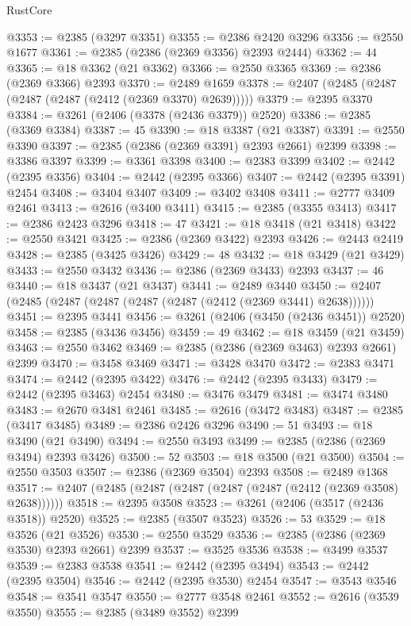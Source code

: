 \begin{lexlean}{RustCore}
\begin{coremodule}
@3353 := @2385 (@3297 @3351)
@3355 := @2386 @2420 @3296
@3356 := @2550 @1677
@3361 := @2385 (@2386 (@2369 @3356) @2393 @2444)
@3362 := 44
@3365 := @18 @3362 (@21 @3362)
@3366 := @2550 @3365
@3369 := @2386 (@2369 @3366) @2393
@3370 := @2489 @1659
@3378 := @2407 (@2485 (@2487 (@2487 (@2487 (@2412 (@2369 @3370) @2639)))))
@3379 := @2395 @3370
@3384 := @3261 (@2406 (@3378 (@2436 @3379)) @2520)
@3386 := @2385 (@3369 @3384)
@3387 := 45
@3390 := @18 @3387 (@21 @3387)
@3391 := @2550 @3390
@3397 := @2385 (@2386 (@2369 @3391) @2393 @2661) @2399
@3398 := @3386 @3397
@3399 := @3361 @3398
@3400 := @2383 @3399
@3402 := @2442 (@2395 @3356)
@3404 := @2442 (@2395 @3366)
@3407 := @2442 (@2395 @3391) @2454
@3408 := @3404 @3407
@3409 := @3402 @3408
@3411 := @2777 @3409 @2461
@3413 := @2616 (@3400 @3411)
@3415 := @2385 (@3355 @3413)
@3417 := @2386 @2423 @3296
@3418 := 47
@3421 := @18 @3418 (@21 @3418)
@3422 := @2550 @3421
@3425 := @2386 (@2369 @3422) @2393
@3426 := @2443 @2419
@3428 := @2385 (@3425 @3426)
@3429 := 48
@3432 := @18 @3429 (@21 @3429)
@3433 := @2550 @3432
@3436 := @2386 (@2369 @3433) @2393
@3437 := 46
@3440 := @18 @3437 (@21 @3437)
@3441 := @2489 @3440
@3450 := @2407 (@2485 (@2487 (@2487 (@2487 (@2487 (@2412 (@2369 @3441) @2638))))))
@3451 := @2395 @3441
@3456 := @3261 (@2406 (@3450 (@2436 @3451)) @2520)
@3458 := @2385 (@3436 @3456)
@3459 := 49
@3462 := @18 @3459 (@21 @3459)
@3463 := @2550 @3462
@3469 := @2385 (@2386 (@2369 @3463) @2393 @2661) @2399
@3470 := @3458 @3469
@3471 := @3428 @3470
@3472 := @2383 @3471
@3474 := @2442 (@2395 @3422)
@3476 := @2442 (@2395 @3433)
@3479 := @2442 (@2395 @3463) @2454
@3480 := @3476 @3479
@3481 := @3474 @3480
@3483 := @2670 @3481 @2461
@3485 := @2616 (@3472 @3483)
@3487 := @2385 (@3417 @3485)
@3489 := @2386 @2426 @3296
@3490 := 51
@3493 := @18 @3490 (@21 @3490)
@3494 := @2550 @3493
@3499 := @2385 (@2386 (@2369 @3494) @2393 @3426)
@3500 := 52
@3503 := @18 @3500 (@21 @3500)
@3504 := @2550 @3503
@3507 := @2386 (@2369 @3504) @2393
@3508 := @2489 @1368
@3517 := @2407 (@2485 (@2487 (@2487 (@2487 (@2487 (@2412 (@2369 @3508) @2638))))))
@3518 := @2395 @3508
@3523 := @3261 (@2406 (@3517 (@2436 @3518)) @2520)
@3525 := @2385 (@3507 @3523)
@3526 := 53
@3529 := @18 @3526 (@21 @3526)
@3530 := @2550 @3529
@3536 := @2385 (@2386 (@2369 @3530) @2393 @2661) @2399
@3537 := @3525 @3536
@3538 := @3499 @3537
@3539 := @2383 @3538
@3541 := @2442 (@2395 @3494)
@3543 := @2442 (@2395 @3504)
@3546 := @2442 (@2395 @3530) @2454
@3547 := @3543 @3546
@3548 := @3541 @3547
@3550 := @2777 @3548 @2461
@3552 := @2616 (@3539 @3550)
@3555 := @2385 (@3489 @3552) @2399

\end{coremodule}
\end{lexlean}
